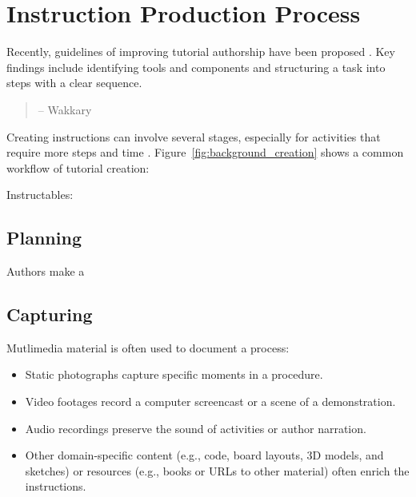 
\section{Instruction Production Process}
\label{background_creation}

Recently, guidelines of improving tutorial authorship have been proposed \cite{Wakkary:2015:TAH:2702123.2702550}. Key findings include identifying tools and components and structuring a task into steps with a clear sequence.

\begin{quote}
 -- Wakkary \ea{}\cite{Wakkary:2015:TAH:2702123.2702550}
\end{quote}

Creating instructions can involve several stages, especially for activities that require more steps and time .
%
Figure~\ref{fig:background_creation} shows a common workflow of tutorial creation:

Instructables: \cite{Tseng:2014:PVP:2598510.2598540}

\subsection{Planning}
Authors make a

\subsection{Capturing}
Mutlimedia material is often used to document a process:
\begin{itemize}
  \itemsep -2pt
  \item Static photographs capture specific moments in a procedure.
  \item Video footages record a computer screencast or a scene of a demonstration.
  \item Audio recordings preserve the sound of activities or author narration.
  \item Other domain-specific content (e.g., code, board layouts, 3D models, and sketches) or resources (e.g., books or URLs to other material) often enrich the instructions.
\end{itemize}

